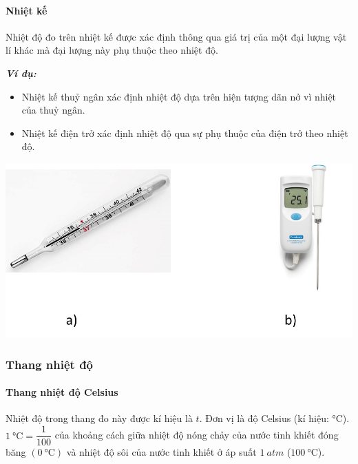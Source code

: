 \begin{tomtat}
\paragraph{Nhiệt kế}
\begin{boxdn}
	Nhiệt độ đo trên nhiệt kế được xác định thông qua giá trị của một đại lượng vật lí khác mà đại lượng này phụ thuộc theo nhiệt độ.
\end{boxdn}
	\textbf{\textit{Ví dụ:}}
	\begin{itemize}
		\item Nhiệt kế thuỷ ngân xác định nhiệt độ dựa trên hiện tượng dãn nở vì nhiệt của thuỷ ngân.
		\item Nhiệt kế điện trở xác định nhiệt độ qua sự phụ thuộc của điện trở theo nhiệt độ.
	\end{itemize}
\begin{center}
	\includegraphics[width=0.5\linewidth]{figs/VN12-Y24-PH-SYL-002-2}
\end{center}
\subsubsection{Thang nhiệt độ}
\paragraph{Thang nhiệt độ Celsius}
\begin{boxdn}
	Nhiệt độ trong thang đo này được kí hiệu là $t$. Đơn vị là độ Celsius (kí hiệu: $\si{\celsius}$).\\
	$\SI{1}{\celsius}=\dfrac{1}{100}$ của khoảng cách giữa nhiệt độ nóng chảy của nước tinh khiết đóng băng $\left(\SI{0}{\celsius}\right)$ và nhiệt độ sôi của nước tinh khiết ở áp suất $\SI{1}{atm}$ ($\SI{100}{\celsius}$).
\end{boxdn}


\end{tomtat}
